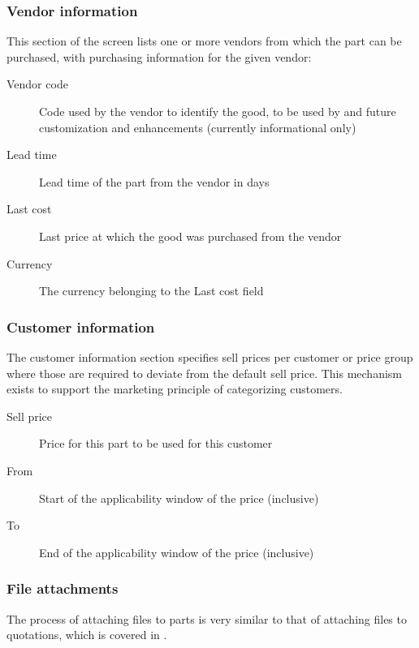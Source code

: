 \subsubsection{Vendor information}
\label{subsubsec-parts-vendor-information}

This section of the screen lists one or more vendors from which the part can be
purchased, with purchasing information for the given vendor:

\begin{description}
\item [Vendor code] Code used by the vendor to identify the good, to be used by
     and future customization and enhancements (currently informational only)
\item [Lead time] Lead time of the part from the vendor in days
\item [Last cost] Last price at which the good was purchased from the vendor
\item [Currency] The currency belonging to the Last cost field
\end{description}

\subsubsection{Customer information}
\label{subsubsec-parts-customer-information}

The customer information section specifies sell prices per customer or price group
where those are required to deviate from the default sell price. This mechanism exists
to support the marketing principle of categorizing customers.

\begin{description}
\item [Sell price] Price for this part to be used for this customer
\item [From] Start of the applicability window of the price (inclusive)
\item [To] End of the applicability window of the price (inclusive)
\end{description}

\subsubsection{File attachments}
\label{subsubsec-parts-file-attachments}

The process of attaching files to parts is very similar to that of
attaching files to quotations, which is covered in .

